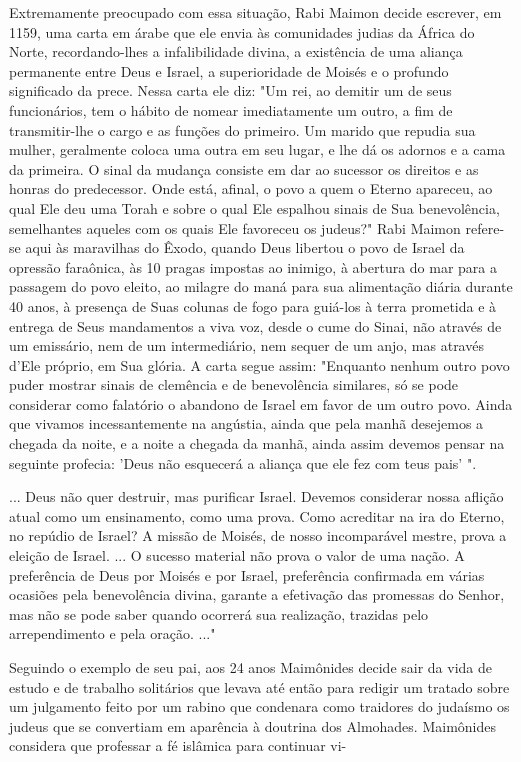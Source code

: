 Extremamente preocupado com essa situação, Rabi Maimon decide escrever,
em 1159, uma carta em árabe que ele envia às comunidades judias da
África do Norte, recordando-lhes a infalibilidade divina, a existência
de uma aliança permanente entre Deus e Israel, a superioridade de Moisés
e o profun­do significado da prece. Nessa carta ele diz: "Um rei, ao
demitir um de seus funcionários, tem o hábito de nomear imediatamente um
outro, a fim de transmitir-lhe o cargo e as funções do primeiro. Um
marido que repudia sua mulher, geralmente coloca uma outra em seu lugar,
e lhe dá os adornos e a ca­ma da primeira. O sinal da mudança consiste
em dar ao sucessor os direitos e as honras do predecessor. Onde está,
afinal, o povo a quem o Eterno apare­ceu, ao qual Ele deu uma Torah e
sobre o qual Ele espalhou sinais de Sua bene­volência, semelhantes
aqueles com os quais Ele favoreceu os judeus?" Rabi Mai­mon refere-se
aqui às maravilhas do Êxodo, quando Deus libertou o povo de Israel da
opressão faraônica, às 10 pragas impostas ao inimigo, à abertura do mar
para a passagem do povo eleito, ao milagre do maná para sua alimentação
diária durante 40 anos, à presença de Suas colunas de fogo para guiá-los
à terra prometida e à entrega de Seus mandamentos a viva voz, desde o
cume do Si­nai, não através de um emissário, nem de um intermediário,
nem sequer de um anjo, mas através d'Ele próprio, em Sua glória. A carta
segue assim: "Enquanto nenhum outro povo puder mostrar sinais de
clemência e de benevolência simi­lares, só se pode considerar como
falatório o abandono de Israel em favor de um outro povo. Ainda que
vivamos incessantemente na angústia, ainda que pe­la manhã desejemos a
chegada da noite, e a noite a chegada da manhã, ainda assim devemos
pensar na seguinte profecia: 'Deus não esquecerá a aliança que ele fez
com teus pais' ".

... Deus não quer destruir, mas purificar Israel. Devemos conside­rar
nossa aflição atual como um ensinamento, como uma prova. Como acredi­tar
na ira do Eterno, no repúdio de Israel? A missão de Moisés, de nosso
incom­parável mestre, prova a eleição de Israel. ... O sucesso material
não prova o valor de uma nação. A preferência de Deus por Moisés e por
Israel, preferência confirmada em várias ocasiões pela benevolência
divina, garante a efetivação das promessas do Senhor, mas não se pode
saber quando ocorrerá sua realiza­ção, trazidas pelo arrependimento e
pela oração. ..."

Seguindo o exemplo de seu pai, aos 24 anos Maimônides decide sair da
vida de estudo e de trabalho solitários que levava até então para
redigir um tratado sobre um julgamento feito por um rabino que condenara
como traido­res do judaísmo os judeus que se convertiam em aparência à
doutrina dos Al­mohades. Maimônides considera que professar a fé
islâmica para continuar vi-

